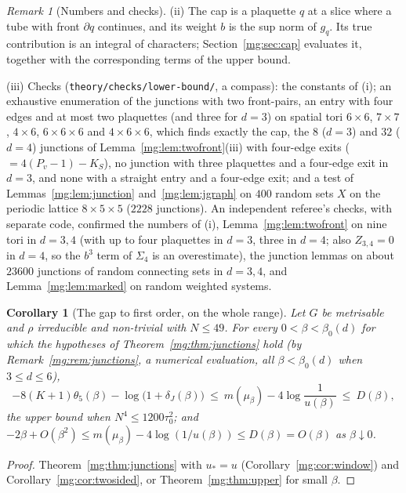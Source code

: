 \documentclass[11pt,a4paper]{article}
\newtheorem{corollary}[theorem]{Corollary}
\theoremstyle{definition}
\theoremstyle{remark}
\newtheorem{remark}[theorem]{Remark}
\begin{document}
\begin{remark}[Numbers and checks]
(ii) The cap is a plaquette $q$ at a slice where a tube with front $\partial q$ continues, and its weight $b$ is the sup norm of $g_q$. Its true
contribution is an integral of characters; Section~\ref{mg:sec:cap} evaluates it, together with the corresponding terms of the upper bound.

(iii) Checks (\texttt{theory/checks/lower-bound/}, a compass): the constants of (i); an exhaustive enumeration of the junctions with two front-pairs, an
entry with four edges and at most two plaquettes (and three for $d=3$) on spatial tori $6\times6$, $7\times7$, $4\times6$, $6\times6\times6$ and
$4\times6\times6$, which finds exactly the cap, the $8$ ($d=3$) and $32$ ($d=4$) junctions of Lemma~\ref{mg:lem:twofront}(iii) with four-edge exits ($=4(P_v-1)-K_S$),
no junction with three plaquettes and a four-edge exit in $d=3$, and none with a straight entry and a four-edge exit; and a test of
Lemmas~\ref{mg:lem:junction} and~\ref{mg:lem:jgraph} on $400$ random sets $X$ on the periodic lattice $8\times5\times5$ ($2228$ junctions). An independent
referee's checks, with separate code, confirmed the numbers of (i), Lemma~\ref{mg:lem:twofront} on nine tori in $d=3,4$ (with up to four plaquettes in $d=3$,
three in $d=4$; also $Z_{3,4}=0$ in $d=4$, so the $b^3$ term of $\Sigma_4$ is an overestimate), the junction lemmas on about $23600$ junctions of random
connecting sets in $d=3,4$, and Lemma~\ref{mg:lem:marked} on random weighted systems.
\end{remark}

\begin{corollary}[The gap to first order, on the whole range]\label{mg:cor:firstorder}
Let $G$ be metrisable and $\rho$ irreducible and non-trivial with $N\le49$. For every $0<\beta<\beta_0(d)$ for which the hypotheses of
Theorem~\ref{mg:thm:junctions} hold (by Remark~\ref{mg:rem:junctions}, a numerical evaluation, all $\beta<\beta_0(d)$ when $3\le d\le6$),
\[
-8(K+1)\theta_5(\beta)-\log\bigl(1+\delta_J(\beta)\bigr)\ \le\ m(\mu_\beta)-4\log\frac1{u(\beta)}\ \le\ D(\beta),
\]
the upper bound when $N^4\le1200\tau_0^2$; and $-2\beta+O(\beta^2)\le m(\mu_\beta)-4\log(1/u(\beta))\le D(\beta)=O(\beta)$ as $\beta\downarrow0$.
\end{corollary}

\begin{proof}
Theorem~\ref{mg:thm:junctions} with $u_*=u$ (Corollary~\ref{mg:cor:window}) and Corollary~\ref{mg:cor:twosided}, or Theorem~\ref{mg:thm:upper} for small $\beta$.
\end{proof}
\end{document}
